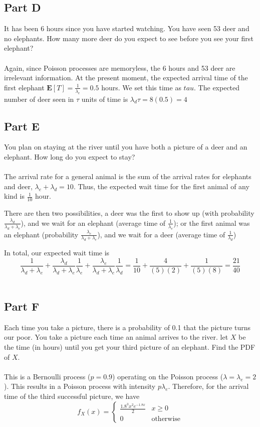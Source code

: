 \documentclass{amsart}
\begin{document}
	\subsection{Part D}
	It has been 6 hours since you have started watching. You have seen 53 deer and no elephants. How many more deer do you expect to see before you see your first elephant?\\
	\\
	Again, since Poisson processes are memoryless, the 6 hours and 53 deer are irrelevant information. At the present moment, the expected arrival time of the first elephant $\mathbf{E}[T] = \frac{1}{\lambda_e}=0.5$ hours. We set this time as $tau$. The expected number of deer seen in $\tau$ units of time is $\lambda_d \tau = 8(0.5)=4$
	\\
	\subsection{Part E}
	You plan on staying at the river until you have both a picture of a deer and an elephant. How long do you expect to stay?\\
	\\
	The arrival rate for a general animal is the sum of the arrival rates for elephants and deer, $\lambda_e + \lambda_d = 10$. Thus, the expected wait time for the first animal of any kind is $\frac{1}{10}$ hour.
	
	There are then two possibilities, a deer was the first to show up (with probability $\frac{\lambda_d}{\lambda_d+\lambda_e}$), and we wait for an elephant (average time of $\frac{1}{\lambda_e}$); or the first animal was an elephant (probability $\frac{\lambda_e}{\lambda_d+\lambda_e}$), and we wait for a deer (average time of $\frac{1}{\lambda_d}$)
	
	In total, our expected wait time is
	\[
	\frac{1}{\lambda_d+\lambda_e} + \frac{\lambda_d}{\lambda_d+\lambda_e}\frac{1}{\lambda_e}
	+\frac{\lambda_e}{\lambda_d + \lambda_e}\frac{1}{\lambda_d} = \frac{1}{10}+\frac{4}{(5)(2)}+\frac{1}{(5)(8)}=\frac{21}{40}
	\]
	\\
	\subsection{Part F}
	Each time you take a picture, there is a probability of 0.1 that the picture turns our poor. You take a picture each time an animal arrives to the river. let $X$ be the time (in hours) until you get your third picture of an elephant. Find the PDF of $X$.\\
	\\
	This is a Bernoulli process ($p=0.9$) operating on the Poisson process ($\lambda = \lambda_e=2$). This results in a Poisson process with intensity $p\lambda_e$. Therefore, for the arrival time of the third successful picture, we have
	\[
	f_X(x) = 
	\begin{cases}
		\frac{1.8^3 x^2 e^{-1.8x}}{2} & x \geq 0\\
		0 & \text{otherwise}
	\end{cases}
	\]
	\pagebreak
\end{document}
